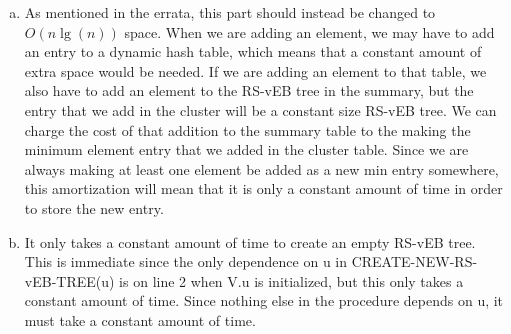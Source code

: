 \documentclass{article}
\begin{document}
\begin{enumerate}[a.]
\item
As mentioned in the errata, this part should instead be changed to $O(n\lg(n))$ space. When we are adding an element, we may have to add an entry to a dynamic hash table, which means that a constant amount of extra space would be needed. If we are adding an element to that table, we also have to add an element to the RS-vEB tree in the summary, but the entry that we add in the cluster will be a constant size RS-vEB tree. We can charge the cost of that addition to the summary table to the making the minimum element entry that we added in the cluster table. Since we are always making at least one element be added as a new min entry somewhere, this amortization will mean that it is only a constant amount of time in order to store the new entry.

\item
It only takes a constant amount of time to create an empty RS-vEB tree. This is immediate since the only dependence on u in CREATE-NEW-RS-vEB-TREE(u) is on line 2 when V.u is initialized, but this only takes a constant amount of time. Since nothing else in the procedure depends on u, it must take a constant amount of time.
\end{enumerate}
\end{document}
